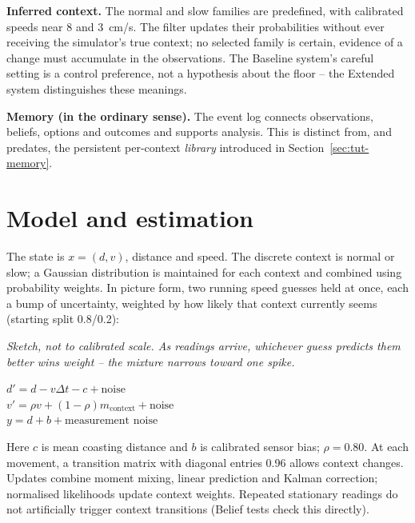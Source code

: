 \documentclass[11pt,a4paper]{article}
\begin{document}
\textbf{Inferred context.} The normal and slow families are predefined, with calibrated speeds near 8 and 3~cm/s. The filter updates their probabilities without ever receiving the simulator's true context; no selected family is certain, evidence of a change must accumulate in the observations. The Baseline system's careful setting is a control preference, not a hypothesis about the floor -- the Extended system distinguishes these meanings.

\textbf{Memory (in the ordinary sense).} The event log connects observations, beliefs, options and outcomes and supports analysis. This is distinct from, and predates, the persistent per-context \emph{library} introduced in Section~\ref{sec:tut-memory}.

\section{Model and estimation}
\label{sec:tut-model}
The state is $x=(d,v)$, distance and speed. The discrete context is normal or slow; a Gaussian distribution is maintained for each context and combined using probability weights. In picture form, two running speed guesses held at once, each a bump of uncertainty, weighted by how likely that context currently seems (starting split 0.8/0.2):
\begin{center}
\end{center}
\textit{\small Sketch, not to calibrated scale. As readings arrive, whichever guess predicts them better wins weight -- the mixture narrows toward one spike.}
\begin{center}\colorbox{ice}{\parbox{.9\linewidth}{\centering
$d'=d-v\Delta t-c+\text{noise}$\\[2pt]
$v'=\rho v+(1-\rho)m_{\text{context}}+\text{noise}$\\[2pt]
$y=d+b+\text{measurement noise}$}}\end{center}
Here $c$ is mean coasting distance and $b$ is calibrated sensor bias; $\rho=0.80$. At each movement, a transition matrix with diagonal entries 0.96 allows context changes. Updates combine moment mixing, linear prediction and Kalman correction; normalised likelihoods update context weights. Repeated stationary readings do not artificially trigger context transitions (Belief tests check this directly).
\end{document}
